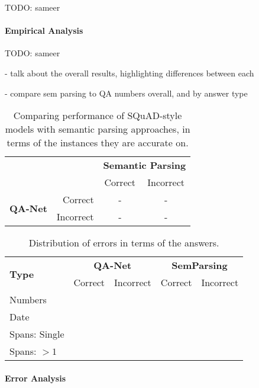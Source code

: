 TODO: sameer

\paragraph{Empirical Analysis}

TODO: sameer

- talk about the overall results, highlighting differences between each

- compare sem parsing to QA numbers overall, and by answer type

\begin{table}
    \centering
    \small
    \begin{tabular}{crcc}
        &&\multicolumn{2}{c}{\bf Semantic Parsing} \\
        && { Correct} & { Incorrect} \\
        \cline{3-4}
    \multirow{2}{*}{\bf QA-Net}&{ Correct} & \multicolumn{1}{|c|}{-} & \multicolumn{1}{|c|}{-}\\
        \cline{3-4}
    &{ Incorrect} & \multicolumn{1}{|c|}{-} & \multicolumn{1}{|c|}{-}\\
        \cline{3-4}
    \end{tabular}
    \caption{Comparing performance of SQuAD-style models with semantic parsing approaches, in terms of the instances they are accurate on.}
    \label{tab:my_label}
\end{table}

\begin{table}
    \centering
    \small
    \begin{tabular}{lcccc}
    \toprule
    \multirow{2}{*}{\bf Type} & \multicolumn{2}{c}{\bf QA-Net} & \multicolumn{2}{c}{\bf SemParsing} \\
    & Correct & Incorrect & Correct &  Incorrect \\
    \midrule
    Numbers & &  & & \\
    Date & &  & & \\
    Spans: Single & &  & & \\
    Spans: $>1$ & &  & & \\
    \bottomrule
    \end{tabular}
    \caption{Distribution of errors in terms of the answers.}
    \label{tab:my_label}
\end{table}


\paragraph{Error Analysis}

